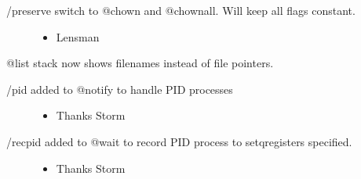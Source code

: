 \documentclass[letterpaper,10pt,english]{sphinxmanual}
\begin{document}
\begin{description}
\begin{itemize}
\end{itemize}

\item[{/preserve switch to @chown and @chownall.  Will keep all flags constant.}] \leavevmode\begin{itemize}
\item {} 
\sphinxAtStartPar
Lensman

\end{itemize}

\end{description}

\sphinxAtStartPar
@list stack now shows filenames instead of file pointers.
\begin{description}
\item[{/pid added to @notify to handle PID processes}] \leavevmode\begin{itemize}
\item {} 
\sphinxAtStartPar
Thanks Storm

\end{itemize}

\item[{/recpid added to @wait to record PID process to setq\sphinxhyphen{}registers specified.}] \leavevmode\begin{itemize}
\item {} 
\sphinxAtStartPar
Thanks Storm

\end{itemize}

\end{description}
\end{document}
